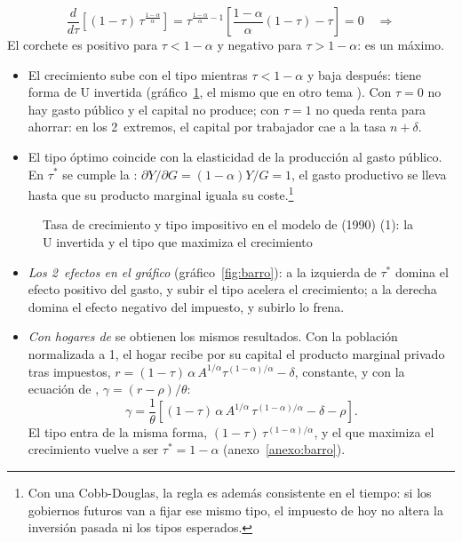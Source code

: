 \documentclass[11pt]{article}
\begin{document}
\begin{itemize}
  \[\frac{d}{d\tau}\left[(1-\tau)\,\tau^{\frac{1-\alpha}{\alpha}}\right]=\tau^{\frac{1-\alpha}{\alpha}-1}\left[\frac{1-\alpha}{\alpha}(1-\tau)-\tau\right]=0\quad\Longrightarrow\]
  El corchete es positivo para $\tau<1-\alpha$ y negativo para $\tau>1-\alpha$: es un máximo.
  \begin{itemize}
  \item El crecimiento sube con el tipo mientras $\tau<1-\alpha$ y baja después: tiene forma de U invertida (gráfico~\ref{fig:barro-1}, el mismo que en otro tema ). Con $\tau=0$ no hay gasto público y el capital no produce; con $\tau=1$ no queda renta para ahorrar: en los 2~extremos, el capital por trabajador cae a la tasa $n+\delta$.
  \item El tipo óptimo coincide con la elasticidad de la producción al gasto público. En $\tau^*$ se cumple la : $\partial Y/\partial G=(1-\alpha)Y/G=1$, el gasto productivo se lleva hasta que su producto marginal iguala su coste.\footnote{Con una Cobb-Douglas, la regla es además consistente en el tiempo: si los gobiernos futuros van a fijar ese mismo tipo, el impuesto de hoy no altera la inversión pasada ni los tipos esperados\nocite{Barro1990}.}
  \end{itemize}
\end{itemize}

\begin{figure}[H]
\centering
\caption{Tasa de crecimiento y tipo impositivo en el modelo de  (1990) (1): la U invertida y el tipo que maximiza el crecimiento}\label{fig:barro-1}
\end{figure}

\begin{itemize}
\item \emph{Los 2~efectos en el gráfico} (gráfico~\ref{fig:barro}): a la izquierda de $\tau^*$ domina el \textcolor{tceeverde}{efecto positivo del gasto}, y subir el tipo acelera el crecimiento; a la derecha domina el \textcolor{tceerojo}{efecto negativo del impuesto}, y subirlo lo frena.
\item \emph{Con hogares de } se obtienen los mismos resultados. Con la población normalizada a 1, el hogar recibe por su capital el producto marginal privado tras impuestos, $r=(1-\tau)\,\alpha\,A^{1/\alpha}\tau^{(1-\alpha)/\alpha}-\delta$, constante, y con la ecuación de , $\gamma=(r-\rho)/\theta$:
  \begin{equation}\label{eq:barro-ramsey}
  \gamma=\frac{1}{\theta}\left[(1-\tau)\,\alpha\,A^{1/\alpha}\,\tau^{(1-\alpha)/\alpha}-\delta-\rho\right].
  \end{equation}
  El tipo entra de la misma forma, $(1-\tau)\,\tau^{(1-\alpha)/\alpha}$, y el que maximiza el crecimiento vuelve a ser $\tau^*=1-\alpha$ (anexo~\ref{anexo:barro}).
\end{itemize}
\end{document}
